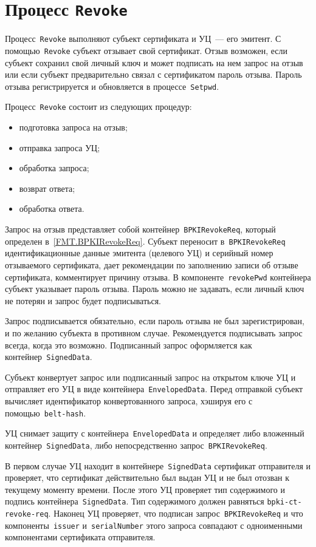 \section{Процесс \texttt{Revoke}}\label{PROCESSES.Revoke}

Процесс~\texttt{Revoke} выполняют субъект сертификата и УЦ~---
его эмитент. С помощью~\texttt{Revoke} субъект отзывает свой сертификат.
Отзыв возможен, если субъект сохранил свой личный ключ и может подписать 
на нем запрос на отзыв или если субъект предварительно связал с 
сертификатом пароль отзыва. Пароль отзыва регистрируется и обновляется
в процессе~\texttt{Setpwd}.

Процесс~\texttt{Revoke} состоит из следующих процедур:
\begin{itemize}
\item
подготовка запроса на отзыв;
\item
отправка запроса УЦ;
\item
обработка запроса;
\item
возврат ответа;
\item
обработка ответа.
\end{itemize}

Запрос на отзыв представляет собой контейнер~\texttt{BPKIRevokeReq},
который определен в~\ref{FMT.BPKIRevokeReq}. Субъект переносит 
в~\texttt{BPKIRevokeReq} идентификационные данные эмитента (целевого УЦ) и 
серийный номер отзываемого сертификата, дает рекомендации по  
заполнению записи об отзыве сертификата, комментирует причину отзыва. В 
компоненте~\texttt{revokePwd} контейнера субъект указывает пароль отзыва. 
Пароль можно не задавать, если личный ключ не потерян и запрос будет 
подписываться.

Запрос подписывается обязательно, если пароль отзыва не был 
зарегистрирован, и по желанию субъекта в противном случае.
%
Рекомендуется подписывать запрос всегда, когда это возможно.
%
Подписанный запрос оформляется как контейнер~\texttt{SignedData}.

Субъект конвертует запрос или подписанный запрос на открытом ключе УЦ
и отправляет его УЦ в виде контейнера~\texttt{EnvelopedData}.
Перед отправкой субъект вычисляет идентификатор конвертованного запроса,
хэшируя его с помощью~\texttt{belt-hash}.

УЦ снимает защиту с контейнера~\texttt{EnvelopedData} и определяет 
либо вложенный контейнер~\texttt{SignedData}, либо непосредственно
запрос~\texttt{BPKIRevokeReq}.

В первом случае УЦ находит в контейнере~\texttt{SignedData}
сертификат отправителя и проверяет, что сертификат действительно 
был выдан УЦ и не был отозван к текущему моменту времени. 
После этого УЦ проверяет тип содержимого и подпись 
контейнера~\texttt{SignedData}. Тип содержимого должен равняться 
\texttt{bpki-ct-revoke-req}. Наконец УЦ проверяет, что  подписан 
запрос~\texttt{BPKIRevokeReq} и что компоненты~\texttt{issuer} 
и~\texttt{serialNumber} этого запроса совпадают с одноименными 
компонентами сертификата отправителя.

